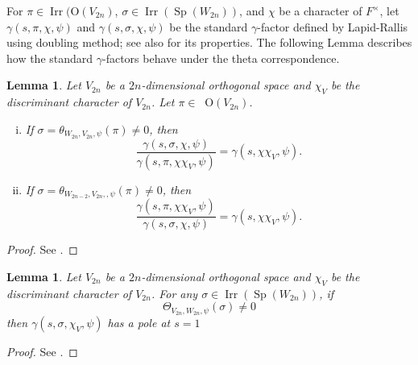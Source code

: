 \documentclass[article]{article}
\numberwithin{equation}{section}
\newtheorem{lemma}[theorem]{Lemma}
\theoremstyle{definition}
\DeclareMathOperator{\SP}{Sp}
\DeclareMathOperator{\Irr}{Irr}
\DeclareMathOperator{\Irrt}{Irr_{temp}}
\begin{document}
For $\pi\in \Irr(\mathrm O(V_{2n})$, $\sigma\in \Irr(\SP(W_{2n}))$, and $\chi$ be a character of $F^\times$, let $\gamma(s,\pi,\chi,\psi)$ and $\gamma(s,\sigma,\chi,\psi)$ be the standard $\gamma$-factor defined by Lapid-Rallis \cite{MR2192828} using doubling method; see also \cite[\S 10,\S 11]{MR3166215} for its properties. The following Lemma describes how the standard $\gamma$-factors behave under the theta correspondence.
\begin{lemma}\label{comgamma}
	Let $V_{2n}$ be a $2n$-dimensional orthogonal space and $\chi_V$ be the discriminant character of $V_{2n}$. Let $\pi \in \Irrt \mathrm O(V_{2n})$. 
	\begin{enumerate}[(i)]
		\item If $\sigma= \theta_{W_{2n}, V_{2n},  \psi}(\pi)\neq 0$, then 	
		$$
		\frac{\gamma(s,\sigma,\chi,\psi)}{\gamma(s,\pi,\chi\chi_V,\psi)}= \gamma(s,\chi\chi_V,\psi).
		$$
		\item If $\sigma= \theta_{W_{2n-2}, V_{2n},  ,\psi}(\pi)\neq 0$, then 
		$$
		\frac{\gamma(s,\pi,\chi\chi_V,\psi)}{\gamma(s,\sigma,\chi,\psi)}= \gamma(s,\chi\chi_V,\psi).
		$$
	\end{enumerate}
\end{lemma}
\begin{proof}
See \cite[Theorem 11.5]{MR3166215}. 
\end{proof}


\begin{lemma}\label{pole}
	Let $V_{2n}$ be a $2n$-dimensional orthogonal space and $\chi_V$ be the discriminant character of $V_{2n}$. For any $\sigma\in \Irr(\SP(W_{2n}))$, if  
	$$	 
	\Theta_{V_{2n},W_{2n},\psi}(\sigma) \neq 0 
	$$
	then $\gamma(s,\sigma,\chi_{V},\psi)$ has a pole at $s=1$
\end{lemma}
\begin{proof}
	See \cite[Proposition 11.2]{MR3166215}. 
\end{proof}
\end{document}
